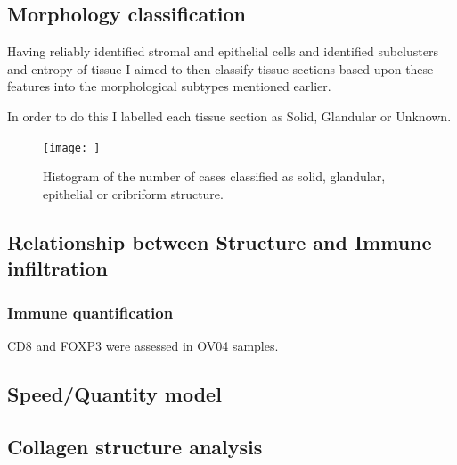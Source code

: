 \subsection{Morphology classification}
Having reliably identified stromal and epithelial cells and identified subclusters and entropy of tissue I aimed to then classify tissue sections based upon these features into the morphological subtypes mentioned earlier.

In order to do this I labelled each tissue section as Solid, Glandular or Unknown.
\begin{figure}
    \centering
    \texttt{[image: ]}
    \caption{Histogram of the number of cases classified as solid, glandular, epithelial  or cribriform structure.}
    \label{fig:num_classl}
\end{figure}

\subsection{Relationship between Structure and Immune infiltration}

\subsubsection{Immune quantification}

CD8 and FOXP3 were assessed in OV04 samples.

\subsection{Speed/Quantity model}

\subsection{Collagen structure analysis}
